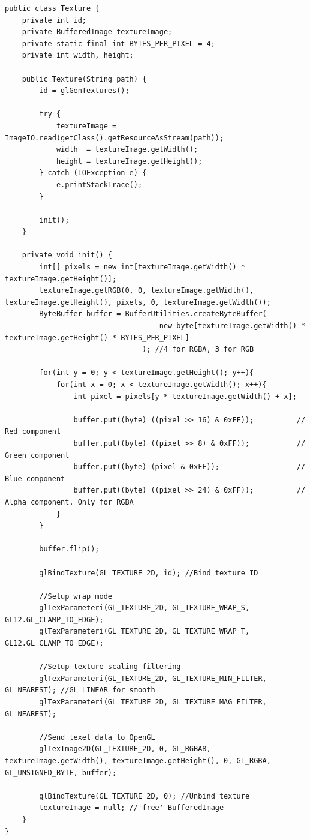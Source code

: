 \documentclass[12pt, 
openright, 
oneside, 
a4paper,    
brazil]{facom-ufu-abntex2}
\begin{document}
\begin{lstlisting}[caption=Inicializando uma textura no OpenGL a partir de um BufferedImage]
public class Texture {
	private int id;
	private BufferedImage textureImage;
	private static final int BYTES_PER_PIXEL = 4;
	private int width, height;
	
	public Texture(String path) {
		id = glGenTextures();
		
		try {
			textureImage = ImageIO.read(getClass().getResourceAsStream(path));
			width  = textureImage.getWidth();
			height = textureImage.getHeight();
		} catch (IOException e) {
			e.printStackTrace();
		}
		
		init();
	}
	
	private void init() {
		int[] pixels = new int[textureImage.getWidth() * textureImage.getHeight()];
		textureImage.getRGB(0, 0, textureImage.getWidth(), textureImage.getHeight(), pixels, 0, textureImage.getWidth());
        ByteBuffer buffer = BufferUtilities.createByteBuffer(
        							new byte[textureImage.getWidth() * textureImage.getHeight() * BYTES_PER_PIXEL]
        						); //4 for RGBA, 3 for RGB
        
        for(int y = 0; y < textureImage.getHeight(); y++){
            for(int x = 0; x < textureImage.getWidth(); x++){
                int pixel = pixels[y * textureImage.getWidth() + x];
            
                buffer.put((byte) ((pixel >> 16) & 0xFF));     		// Red component
                buffer.put((byte) ((pixel >> 8) & 0xFF));      		// Green component
                buffer.put((byte) (pixel & 0xFF));              	// Blue component
                buffer.put((byte) ((pixel >> 24) & 0xFF));    		// Alpha component. Only for RGBA
            }
        }

        buffer.flip();

        glBindTexture(GL_TEXTURE_2D, id); //Bind texture ID
        
        //Setup wrap mode
        glTexParameteri(GL_TEXTURE_2D, GL_TEXTURE_WRAP_S, GL12.GL_CLAMP_TO_EDGE);
        glTexParameteri(GL_TEXTURE_2D, GL_TEXTURE_WRAP_T, GL12.GL_CLAMP_TO_EDGE);

        //Setup texture scaling filtering
        glTexParameteri(GL_TEXTURE_2D, GL_TEXTURE_MIN_FILTER, GL_NEAREST); //GL_LINEAR for smooth
        glTexParameteri(GL_TEXTURE_2D, GL_TEXTURE_MAG_FILTER, GL_NEAREST);
        
        //Send texel data to OpenGL
        glTexImage2D(GL_TEXTURE_2D, 0, GL_RGBA8, textureImage.getWidth(), textureImage.getHeight(), 0, GL_RGBA, GL_UNSIGNED_BYTE, buffer);
        
        glBindTexture(GL_TEXTURE_2D, 0); //Unbind texture
        textureImage = null; //'free' BufferedImage
	}
}
\end{lstlisting}
\end{document}
